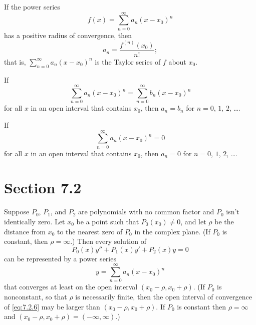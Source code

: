 \setcounter{theorem}{4}
\setcounter{equation}{8}
\begin{theorem}
  \label{thmtype:7.1.5} If the power series
  \[
    f(x)=\sum_{n=0}^{\infty}a_{n}(x-x_{0})^{n}
  \]
  has a positive radius of convergence, then
  \begin{equation}
    \label{eq:7.1.9}a_{n}=\frac{f^{(n)}(x_{0})}{n!};
  \end{equation}
  that is, $\sum_{n=0}^{\infty}a_{n}(x-x_{0})^{n}$ is the Taylor series of $f$ about $x_{0}$.
\end{theorem}

\setcounter{theorem}{5}
\begin{theorem}
  \label{thmtype:7.1.6}\mbox{}
  \newline
  \begin{alist}
    \item %
    If
    \[
      \sum_{n=0}^{\infty}a_{n}(x-x_{0})^{n}=\sum_{n=0}^{\infty}b_{n}(x-x_{0})^{n}
    \]
    for all $x$ in an open interval that contains $x_{0}$, then $a_{n}=b_{n}$ for $n=0$, $1$, $2$,
    \dots.

    \item %
    If
    \[
      \sum_{n=0}^{\infty}a_{n}(x-x_{0})^{n}=0
    \]
    for all $x$ in an open interval that contains $x_{0}$, then $a_{n}=0$ for $n=0$, $1$, $2$,
    \dots.
  \end{alist}
\end{theorem}

\section*{Section 7.2}
\setcounter{chapter}{7}
\setcounter{section}{2}

\setcounter{theorem}{0}
\setcounter{equation}{4}
\begin{theorem}
  \label{thmtype:7.2.1} Suppose $P_{0}$, $P_{1}$, and $P_{2}$ are polynomials with no common factor
  and $P_{0}$ isn't identically zero. Let $x_{0}$ be a point such that $P_{0}(x_{0})\ne0$, and let
  $\rho$ be the distance from $x_{0}$ to the nearest zero of $P_{0}$ in the complex plane. (If
  $P_{0}$ is constant, then $\rho=\infty$.) Then every solution of
  \begin{equation}
    \label{eq:7.2.5}P_{0}(x)y''+P_{1}(x)y'+P_{2}(x)y=0
  \end{equation}
  can be represented by a power series
  \begin{equation}
    \label{eq:7.2.6}y=\sum_{n=0}^{\infty}a_{n}(x-x_{0})^{n}
  \end{equation}
  that converges at least on the open interval $(x_{0}-\rho,x_{0}+\rho)$. (If $P_{0}$ is
  nonconstant, so that $\rho$ is necessarily finite, then the open interval of convergence of
  \eqref{eq:7.2.6} may be larger than $(x_{0}-\rho,x_{0}+\rho)$. If $P_{0}$ is constant then
  $\rho=\infty$ and $(x_{0}-\rho,x_{0}+\rho)=(-\infty,\infty)$.)
\end{theorem}

